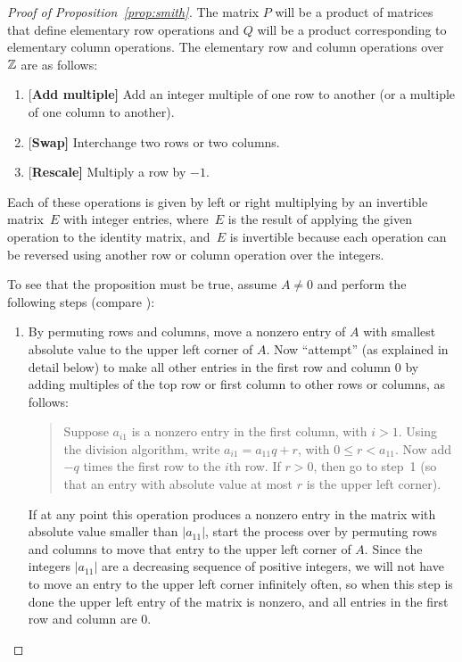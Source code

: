 \begin{proof}[Proof of Proposition~\ref{prop:smith}]  The matrix $P$ will be a product of matrices that define elementary
  row operations and $Q$ will be a product corresponding to elementary
  column operations.  The elementary row and column operations over
  $\mathbb{Z}$ are as follows:
\begin{enumerate}
\item{}{[\bf Add multiple]} Add an integer multiple of one row to another (or a multiple
of one column to another).
\item{}{[\bf Swap]} Interchange two rows or two columns.
\item{}{[\bf Rescale]} Multiply a row by $-1$.
\end{enumerate}
Each of these operations is given by left or right multiplying by an
invertible matrix~$E$ with integer entries, where~$E$ is the result of
applying the given operation to the identity matrix, and~$E$ is
invertible because each operation can be reversed using another row or
column operation over the integers.

To see that the proposition must be true, assume $A\neq 0$ and perform
the following steps (compare \cite[pg.~459]{artin:algebra}):
\begin{enumerate}
\item By permuting rows and columns, move a nonzero entry of $A$ with
  smallest absolute value to the upper left corner of $A$.  Now
  ``attempt'' (as explained in detail below) to make all other entries
  in the first row and column $0$ by adding multiples of the top row
  or first column to other rows or columns, as follows:
\begin{quote}
Suppose $a_{i1}$ is a nonzero entry in the first column, with
$i>1$.  Using the division algorithm, write $a_{i1} = a_{11}q + r$,
with $0\leq r < a_{11}$.  Now add $-q$ times the first row to the
$i$th row.  If $r>0$, then go to step~1 (so that an entry with
absolute value at most $r$ is the upper left corner).  
\end{quote}
  If at any point this operation produces a nonzero entry in the
  matrix with absolute value smaller than $|a_{11}|$, start the
  process over by permuting rows and columns to move that entry to the
  upper left corner of $A$.  Since the integers $|a_{11}|$ are a
  decreasing sequence of positive integers, we will not have to move
  an entry to the upper left corner infinitely often, so when this
  step is done the upper left entry of the matrix is nonzero, and all
  entries in the first row and column are 0.



\end{enumerate}
\end{proof}
